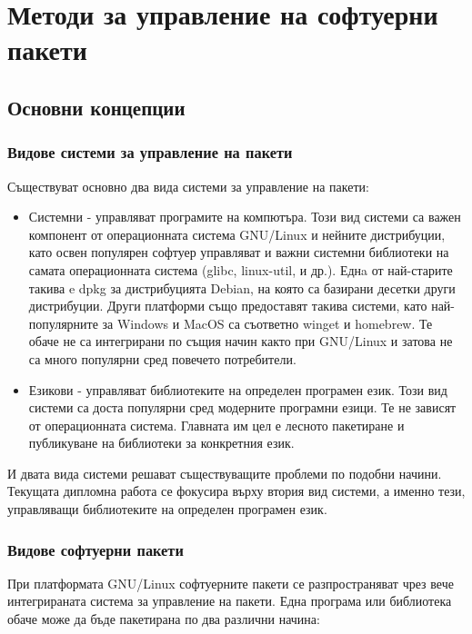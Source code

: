 \chapter{Методи за управление на софтуерни пакети}


\section{Основни концепции}

\subsection{Видове системи за управление на пакети}

Съществуват основно два вида системи за управление на пакети:

\begin{itemize}
    \item Системни - управляват програмите на компютъра. Този вид системи са
          важен компонент от операционната система GNU/Linux и нейните
          дистрибуции, като освен популярен софтуер управляват и важни системни
          библиотеки на самата операционната система (glibc, linux-util, и др.).
          Еднa от най-старите такива e dpkg за дистрибуцията Debian, на която са
          базирани десетки други дистрибуции. Други платформи също предоставят
          такива системи, като най-популярните за Windows и MacOS са съответно
          winget и homebrew. Те обаче не са интегрирани по същия начин както при
          GNU/Linux и затова не са много популярни сред повечето потребители.
    \item Езикови - управляват библиотеките на определен програмен език. Този
          вид системи са доста популярни сред модерните програмни езици. Те не
          зависят от операционната система. Главната им цел е лесното пакетиране
          и публикуване на библиотеки за конкретния език.
\end{itemize}

И двата вида системи решават съществуващите проблеми по подобни начини. Текущата
дипломна работа се фокусира върху втория вид системи, а именно тези, управляващи
библиотеките на определен програмен език.


\subsection{Видове софтуерни пакети}

При платформата GNU/Linux софтуерните пакети се разпространяват чрез вече
интегрираната система за управление на пакети. Една програма или библиотека
обаче може да бъде пакетирана по два различни начина:

